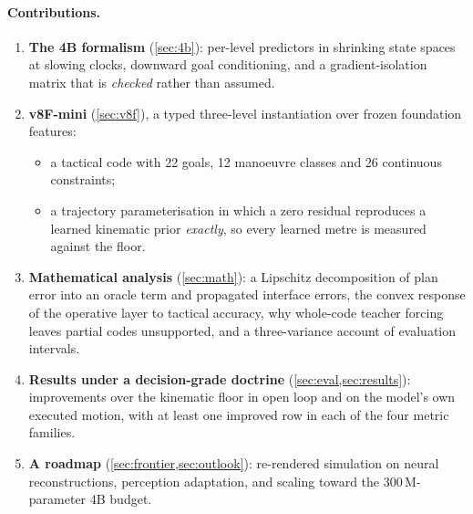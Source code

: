 \documentclass[10pt,twocolumn]{article}
\theoremstyle{remark}
\begin{document}
\paragraph{Contributions.}
\begin{enumerate}[label=(\roman*)]
  \item \textbf{The 4B formalism} (\cref{sec:4b}): per-level predictors in shrinking state spaces at slowing clocks, downward goal
        conditioning, and a gradient-isolation matrix that is \emph{checked} rather than assumed.
  \item \textbf{v8F-mini} (\cref{sec:v8f}), a typed three-level instantiation over frozen foundation features:
        \begin{itemize}
          \item a tactical code with 22 goals, 12 manoeuvre classes and 26 continuous constraints;
          \item a trajectory parameterisation in which a zero residual reproduces a learned kinematic prior \emph{exactly}, so every
                learned metre is measured against the floor.
        \end{itemize}
  \item \textbf{Mathematical analysis} (\cref{sec:math}): a Lipschitz decomposition of plan error into an oracle term and propagated
        interface errors, the convex response of the operative layer to tactical accuracy, why whole-code teacher forcing leaves
        partial codes unsupported, and a three-variance account of evaluation intervals.
  \item \textbf{Results under a decision-grade doctrine} (\cref{sec:eval,sec:results}): improvements over the kinematic floor in open
        loop and on the model's own executed motion, with at least one improved row in each of the four metric families.
  \item \textbf{A roadmap} (\cref{sec:frontier,sec:outlook}): re-rendered simulation on neural reconstructions, perception adaptation,
        and scaling toward the 300\,M-parameter 4B budget.
\end{enumerate}

\end{document}
